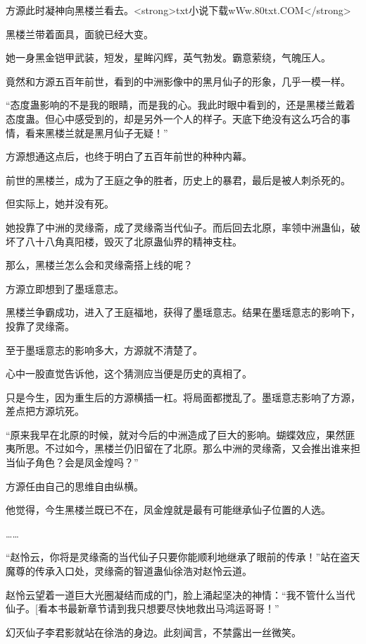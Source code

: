 
\begin{this_body}

方源此时凝神向黑楼兰看去。<strong>txt小说下载wWw.80txt.COM</strong>

黑楼兰带着面具，面貌已经大变。

她一身黑金铠甲武装，短发，星眸闪辉，英气勃发。霸意萦绕，气魄压人。

竟然和方源五百年前世，看到的中洲影像中的黑月仙子的形象，几乎一模一样。

“态度蛊影响的不是我的眼睛，而是我的心。我此时眼中看到的，还是黑楼兰戴着态度蛊。但心中感受到的，却是另外一个人的样子。天底下绝没有这么巧合的事情，看来黑楼兰就是黑月仙子无疑！”

方源想通这点后，也终于明白了五百年前世的种种内幕。

前世的黑楼兰，成为了王庭之争的胜者，历史上的暴君，最后是被人刺杀死的。

但实际上，她并没有死。

她投靠了中洲的灵缘斋，成了灵缘斋当代仙子。而后回去北原，率领中洲蛊仙，破坏了八十八角真阳楼，毁灭了北原蛊仙界的精神支柱。

那么，黑楼兰怎么会和灵缘斋搭上线的呢？

方源立即想到了墨瑶意志。

黑楼兰争霸成功，进入了王庭福地，获得了墨瑶意志。结果在墨瑶意志的影响下，投靠了灵缘斋。

至于墨瑶意志的影响多大，方源就不清楚了。

心中一股直觉告诉他，这个猜测应当便是历史的真相了。

只是今生，因为重生后的方源横插一杠。将局面都搅乱了。墨瑶意志影响了方源，差点把方源坑死。

“原来我早在北原的时候，就对今后的中洲造成了巨大的影响。蝴蝶效应，果然匪夷所思。不过如今，黑楼兰仍旧留在了北原。那么中洲的灵缘斋，又会推出谁来担当仙子角色？会是凤金煌吗？”

方源任由自己的思维自由纵横。

他觉得，今生黑楼兰既已不在，凤金煌就是最有可能继承仙子位置的人选。

……

“赵怜云，你将是灵缘斋的当代仙子只要你能顺利地继承了眼前的传承！”站在盗天魔尊的传承入口处，灵缘斋的智道蛊仙徐浩对赵怜云道。

赵怜云望着一道巨大光圈凝结而成的门，脸上涌起坚决的神情：“我不管什么当代仙子。[看本书最新章节请到我只想要尽快地救出马鸿运哥哥！”

幻灭仙子李君影就站在徐浩的身边。此刻闻言，不禁露出一丝微笑。


\end{this_body}
